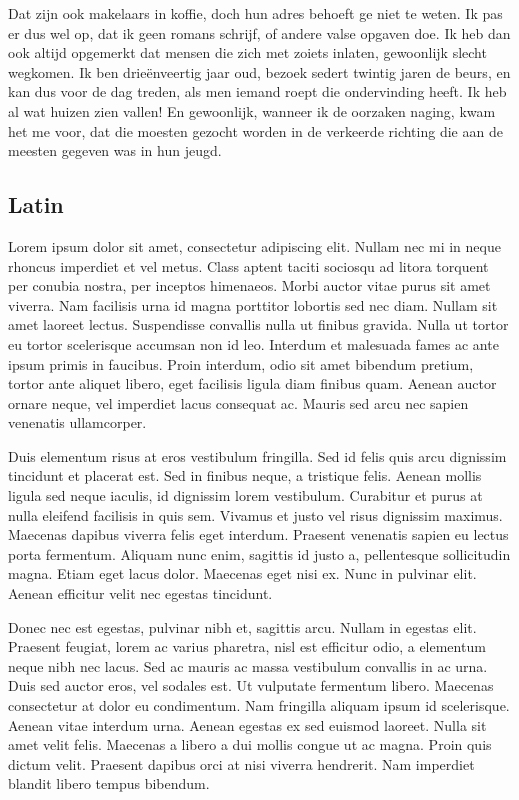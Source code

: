\documentclass[sigconf]{acmart}
\begin{document}
Dat zijn ook makelaars in koffie, doch hun adres behoeft ge niet te weten. Ik pas er dus wel op, dat ik geen romans schrijf, of andere valse opgaven doe. Ik heb dan ook altijd opgemerkt dat mensen die zich met zoiets inlaten, gewoonlijk slecht wegkomen. Ik ben drieënveertig jaar oud, bezoek sedert twintig jaren de beurs, en kan dus voor de dag treden, als men iemand roept die ondervinding heeft. Ik heb al wat huizen zien vallen! En gewoonlijk, wanneer ik de oorzaken naging, kwam het me voor, dat die moesten gezocht worden in de verkeerde richting die aan de meesten gegeven was in hun jeugd.

\subsection{Latin}
Lorem ipsum dolor sit amet, consectetur adipiscing elit. Nullam nec mi in neque rhoncus imperdiet et vel metus. Class aptent taciti sociosqu ad litora torquent per conubia nostra, per inceptos himenaeos. Morbi auctor vitae purus sit amet viverra. Nam facilisis urna id magna porttitor lobortis sed nec diam. Nullam sit amet laoreet lectus. Suspendisse convallis nulla ut finibus gravida. Nulla ut tortor eu tortor scelerisque accumsan non id leo. Interdum et malesuada fames ac ante ipsum primis in faucibus. Proin interdum, odio sit amet bibendum pretium, tortor ante aliquet libero, eget facilisis ligula diam finibus quam. Aenean auctor ornare neque, vel imperdiet lacus consequat ac. Mauris sed arcu nec sapien venenatis ullamcorper.

Duis elementum risus at eros vestibulum fringilla. Sed id felis quis arcu dignissim tincidunt et placerat est. Sed in finibus neque, a tristique felis. Aenean mollis ligula sed neque iaculis, id dignissim lorem vestibulum. Curabitur et purus at nulla eleifend facilisis in quis sem. Vivamus et justo vel risus dignissim maximus. Maecenas dapibus viverra felis eget interdum. Praesent venenatis sapien eu lectus porta fermentum. Aliquam nunc enim, sagittis id justo a, pellentesque sollicitudin magna. Etiam eget lacus dolor. Maecenas eget nisi ex. Nunc in pulvinar elit. Aenean efficitur velit nec egestas tincidunt.

Donec nec est egestas, pulvinar nibh et, sagittis arcu. Nullam in egestas elit. Praesent feugiat, lorem ac varius pharetra, nisl est efficitur odio, a elementum neque nibh nec lacus. Sed ac mauris ac massa vestibulum convallis in ac urna. Duis sed auctor eros, vel sodales est. Ut vulputate fermentum libero. Maecenas consectetur at dolor eu condimentum. Nam fringilla aliquam ipsum id scelerisque. Aenean vitae interdum urna. Aenean egestas ex sed euismod laoreet. Nulla sit amet velit felis. Maecenas a libero a dui mollis congue ut ac magna. Proin quis dictum velit. Praesent dapibus orci at nisi viverra hendrerit. Nam imperdiet blandit libero tempus bibendum.
\end{document}
